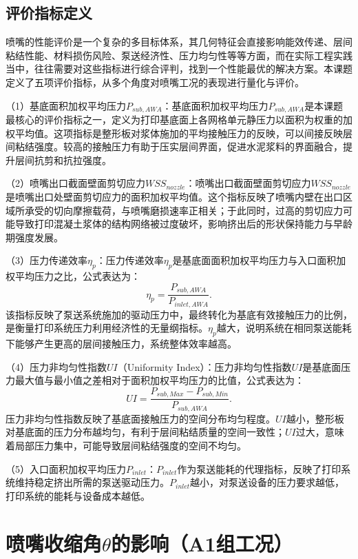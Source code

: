 \subsection{评价指标定义}

喷嘴的性能评价是一个复杂的多目标体系，其几何特征会直接影响能效传递、层间粘结性能、材料损伤风险、泵送经济性、压力均匀性等等方面，而在实际工程实践当中，往往需要对这些指标进行综合评判，找到一个性能最优的解决方案。本课题定义了五项评价指标，从多个角度对喷嘴工况的表现进行量化与评价。

（1）基底面积加权平均压力$P_{sub,AWA}$：基底面积加权平均压力$P_{sub,AWA}$是本课题最核心的评价指标之一，定义为打印基底面上各网格单元静压力以面积为权重的加权平均值。这项指标是整形板对浆体施加的平均接触压力的反映，可以间接反映层间粘结强度。较高的接触压力有助于压实层间界面，促进水泥浆料的界面融合，提升层间抗剪和抗拉强度。

（2）喷嘴出口截面壁面剪切应力$WSS_{nozzle}$：喷嘴出口截面壁面剪切应力$WSS_{nozzle}$是喷嘴出口处壁面剪切应力的面积加权平均值。这个指标反映了喷嘴内壁在出口区域所承受的切向摩擦载荷，与喷嘴磨损速率正相关；于此同时，过高的剪切应力可能导致打印混凝土浆体的结构网络被过度破坏，影响挤出后的形状保持能力与早龄期强度发展。

（3）压力传递效率$\eta_p$：压力传递效率$\eta_p$是基底面面积加权平均压力与入口面积加权平均压力之比，公式表达为：
\begin{equation}\label{eq:eta-p}
  \eta_p = \frac{P_{sub,AWA}}{P_{inlet,AWA}}.
\end{equation}
该指标反映了泵送系统施加的驱动压力中，最终转化为基底有效接触压力的比例，是衡量打印系统压力利用经济性的无量纲指标。$\eta_p$越大，说明系统在相同泵送能耗下能够产生更高的层间接触压力，系统整体效率越高。

（4）压力非均匀性指数$UI$（Uniformity Index）：压力非均匀性指数$UI$是基底面压力最大值与最小值之差相对于面积加权平均压力的比值，公式表达为：
\begin{equation}\label{eq:UI}
  UI = \frac{P_{sub,Max} - P_{sub,Min}}{P_{sub,AWA}}.
\end{equation}
压力非均匀性指数反映了基底面接触压力的空间分布均匀程度。$UI$越小，整形板对基底面的压力分布越均匀，有利于层间粘结质量的空间一致性；$UI$过大，意味着局部压力集中，可能导致层间粘结强度的空间不均匀。

（5）入口面积加权平均压力$P_{inlet}$：$P_{inlet}$作为泵送能耗的代理指标，反映了打印系统维持稳定挤出所需的泵送驱动压力。$P_{inlet}$越小，对泵送设备的压力要求越低，打印系统的能耗与设备成本越低。

\section{喷嘴收缩角$\theta$的影响（A1组工况）}

